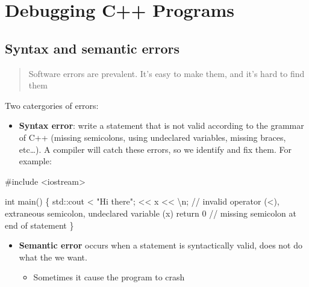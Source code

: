 \documentclass[
  letterpaper,
  DIV=11,
  numbers=noendperiod]{scrreprt}
\newenvironment{Shaded}{\begin{snugshade}}{\end{snugshade}}
\newcommand{\CommentTok}[1]{\textcolor[rgb]{0.37,0.37,0.37}{#1}}
\newcommand{\DecValTok}[1]{\textcolor[rgb]{0.68,0.00,0.00}{#1}}
\newcommand{\ErrorTok}[1]{\textcolor[rgb]{0.68,0.00,0.00}{#1}}
\newcommand{\FunctionTok}[1]{\textcolor[rgb]{0.28,0.35,0.67}{#1}}
\newcommand{\NormalTok}[1]{\textcolor[rgb]{0.00,0.23,0.31}{#1}}
\newcommand{\SpecialCharTok}[1]{\textcolor[rgb]{0.37,0.37,0.37}{#1}}
\newcommand{\StringTok}[1]{\textcolor[rgb]{0.13,0.47,0.30}{#1}}
\providecommand{\tightlist}{%
  \setlength{\itemsep}{0pt}\setlength{\parskip}{0pt}}\usepackage{longtable,booktabs,array}
\begin{document}

\hypertarget{debugging-c-programs}{%
\chapter{Debugging C++ Programs}\label{debugging-c-programs}}

\hypertarget{syntax-and-semantic-errors}{%
\section{Syntax and semantic errors}\label{syntax-and-semantic-errors}}

\begin{quote}
Software errors are prevalent. It's easy to make them, and it's hard to
find them
\end{quote}

Two catergories of errors:

\begin{itemize}
\tightlist
\item
  \textbf{Syntax error}: write a statement that is not valid according
  to the grammar of C++ (missing semicolons, using undeclared variables,
  missing braces, etc\ldots). A compiler will catch these errors, so we
  identify and fix them. For example:
\end{itemize}

\begin{Shaded}
\begin{Highlighting}[]
\CommentTok{\#include \textless{}iostream\textgreater{}}

\NormalTok{int }\FunctionTok{main}\NormalTok{()}
\NormalTok{\{}
\NormalTok{    std}\SpecialCharTok{::}\NormalTok{cout }\SpecialCharTok{\textless{}} \StringTok{"Hi there"}\NormalTok{; }\SpecialCharTok{\textless{}}\ErrorTok{\textless{}}\NormalTok{ x }\SpecialCharTok{\textless{}}\ErrorTok{\textless{}} \StringTok{\textquotesingle{}}\SpecialCharTok{\textbackslash{}n}\StringTok{\textquotesingle{}}\NormalTok{; }\SpecialCharTok{/}\ErrorTok{/}\NormalTok{ invalid }\FunctionTok{operator}\NormalTok{ (}\SpecialCharTok{\textless{}}\NormalTok{), extraneous semicolon, undeclared }\FunctionTok{variable}\NormalTok{ (x)}
\NormalTok{    return }\DecValTok{0} \SpecialCharTok{/}\ErrorTok{/}\NormalTok{ missing semicolon at end of statement}
\NormalTok{\}}
\end{Highlighting}
\end{Shaded}

\begin{itemize}
\item
  \textbf{Semantic error} occurs when a statement is syntactically
  valid, does not do what the we want.

  \begin{itemize}
  \tightlist
  \item
    Sometimes it cause the program to crash
  \end{itemize}
\end{itemize}
\end{document}
